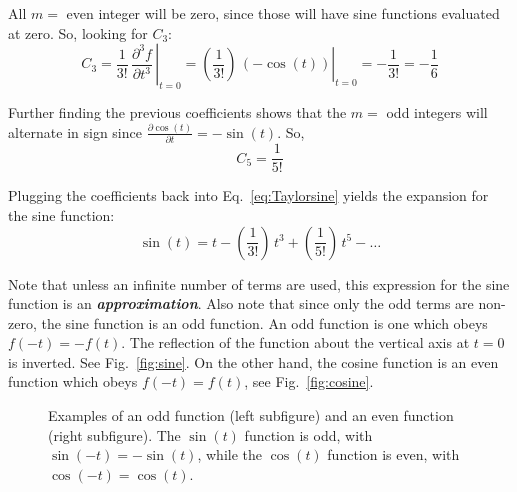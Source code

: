 \documentclass[12pt]{article}
\begin{document}
\begin{flushleft}
All $m=$ even integer will be zero, since those will have sine functions evaluated at zero.  So, looking for $C_{3}$:
\[
C_{3}=\left. \frac{1}{3!}\,\frac{\partial^{3}f}{\partial t^{3}}\, \right|_{t=0}
=  \left. \left(\frac{1}{3!}\right) \, \left( -\cos{(t)} \right)  \right|_{t=0} = -\frac{1}{3!} = -\frac{1}{6}
\]

Further finding the previous coefficients shows that the $m=$ odd integers will alternate in sign since $\frac{\partial \cos{(t)}}{\partial t} = -\sin{(t)}$.  So, 
\[
C_{5}=\frac{1}{5!}
\]

Plugging the coefficients back into Eq.~\ref{eq:Taylorsine} yields the expansion for the sine function:
\[
\sin{(t)} = t - \left( \frac{1}{3!}\right) \, t^{3} + \left( \frac{1}{5!}\right) \, t^{5} - \dots
\]

Note that unless an infinite number of terms are used, this expression for the sine function is an \textbf{\textit{ approximation}}.  Also note that since only the odd terms are non-zero, the sine function is an odd function.  An odd function is one which obeys $f(-t)=-f(t)$.  The reflection of the function about the vertical axis at $t=0$ is inverted.  See Fig.~\ref{fig:sine}.  On the other hand, the cosine function is an even function which obeys $f(-t)=f(t)$, see Fig.~\ref{fig:cosine}.

\begin{figure}[h]
\begin{center}
\hspace{0.2in}
\end{center}
\caption{\small Examples of an odd function (left subfigure) and an even function (right subfigure).  The $\sin{(t)}$ function is odd,  with $\sin{(-t)}=-\sin{(t)}$, while the $\cos{(t)}$ function is even, with $\cos{(-t)}=\cos{(t)}$.}
\label{fig:sinusoids}
\end{figure}


\end{flushleft}
\end{document}
